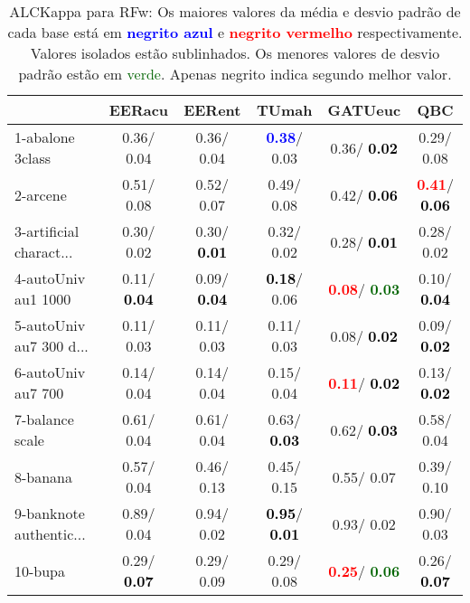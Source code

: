 \begin{table}[h]
\caption{ALCKappa para RFw: Os maiores valores da média e desvio padrão de cada base está em \textcolor{blue}{\textbf{negrito azul}} e \textcolor{red}{\textbf{negrito vermelho}} respectivamente. Valores isolados estão sublinhados. Os menores valores de desvio padrão estão em \textcolor{darkgreen}{verde}. Apenas negrito indica segundo melhor valor.}
\begin{center}\begin{tabular}{lc|c|c|c|c}
 & EERacu & EERent & TUmah & \textbf{GATUeuc} & QBC\\ \hline 1-abalone 3class &   0.36/  0.04 &   0.36/  0.04 & \textcolor{blue}{\textbf{  0.38}}/  0.03 &   0.36/\textcolor{black}{\textbf{  0.02}} &   0.29/  0.08 \\
2-arcene &   0.51/  0.08 &   0.52/  0.07 &   0.49/  0.08 &   0.42/\textcolor{black}{\textbf{  0.06}} & \textcolor{red}{\textbf{  0.41}}/\textcolor{black}{\textbf{  0.06}} \\
3-artificial charact... &   0.30/  0.02 &   0.30/\textcolor{black}{\textbf{  0.01}} &   0.32/  0.02 &   0.28/\textcolor{black}{\textbf{  0.01}} &   0.28/  0.02 \\
4-autoUniv au1 1000 &   0.11/\textcolor{black}{\textbf{  0.04}} &   0.09/\textcolor{black}{\textbf{  0.04}} & \textcolor{black}{\textbf{  0.18}}/  0.06 & \textcolor{red}{\textbf{  0.08}}/\textcolor{darkgreen}{\textbf{  0.03}} &   0.10/\textcolor{black}{\textbf{  0.04}} \\
5-autoUniv au7 300 d... &   0.11/  0.03 &   0.11/  0.03 &   0.11/  0.03 &   0.08/\textcolor{black}{\textbf{  0.02}} &   0.09/\textcolor{black}{\textbf{  0.02}} \\
6-autoUniv au7 700 &   0.14/  0.04 &   0.14/  0.04 &   0.15/  0.04 & \textcolor{red}{\textbf{  0.11}}/\textcolor{black}{\textbf{  0.02}} &   0.13/\textcolor{black}{\textbf{  0.02}} \\
7-balance scale &   0.61/  0.04 &   0.61/  0.04 &   0.63/\textcolor{black}{\textbf{  0.03}} &   0.62/\textcolor{black}{\textbf{  0.03}} &   0.58/  0.04 \\ \hline
8-banana &   0.57/  0.04 &   0.46/  0.13 &   0.45/  0.15 &   0.55/  0.07 &   0.39/  0.10 \\
9-banknote authentic... &   0.89/  0.04 &   0.94/  0.02 & \textcolor{black}{\textbf{  0.95}}/\textcolor{black}{\textbf{  0.01}} &   0.93/  0.02 &   0.90/  0.03 \\
10-bupa &   0.29/\textcolor{black}{\textbf{  0.07}} &   0.29/  0.09 &   0.29/  0.08 & \textcolor{red}{\textbf{  0.25}}/\textcolor{darkgreen}{\textbf{  0.06}} &   0.26/\textcolor{black}{\textbf{  0.07}} \\

\end{tabular}
\end{center}
\end{table}
